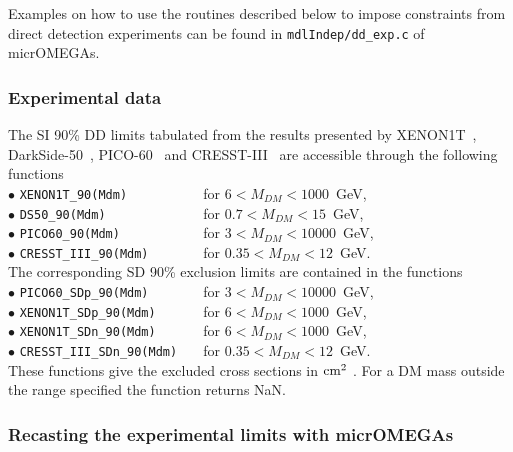 \documentclass[12pt,a4paper]{article}
\begin{document}
Examples on how to use the routines described below to impose constraints from direct detection experiments  can be found  in \verb|mdlIndep/dd_exp.c| of micrOMEGAs. 
\subsubsection{Experimental data}

The SI 90\%  DD  limits  tabulated from the results presented by  XENON1T~\cite{Aprile:2018dbl}, DarkSide-50~\cite{Agnes:2018ves}, PICO-60~\cite{Amole:2019fdf}  and CRESST-III~\cite{Abdelhameed:2019hmk}  are accessible through  the following functions \\

\noindent
$\bullet$ \verb|XENON1T_90(Mdm)          | for  $ 6 <  M_{DM} < 1000$~GeV, \cite{Aprile:2018dbl}  \\
\noindent
$\bullet$ \verb|DS50_90(Mdm)             | for  $ 0.7 < M_{DM} < 15$~GeV, \cite{Agnes:2018ves}   \\
\noindent
$\bullet$ \verb|PICO60_90(Mdm)           | for  $ 3 < M_{DM} < 10000$~GeV, \cite{Amole:2019fdf}   \\
\noindent
$\bullet$ \verb|CRESST_III_90(Mdm)       |  for $ 0.35 < M_{DM} < 12$~GeV. \cite{Abdelhameed:2019hmk} \\



\noindent
The corresponding SD 90\% exclusion limits are contained in the functions\\

\noindent 
$\bullet$ \verb|PICO60_SDp_90(Mdm)       | for  $ 3 < M_{DM} < 10000$~GeV,  \cite{Amole:2019fdf} \\
\noindent
$\bullet$ \verb|XENON1T_SDp_90(Mdm)      | for  $ 6 <  M_{DM} < 1000$~GeV, \cite{Aprile:2019dbj} \\
\noindent
$\bullet$ \verb|XENON1T_SDn_90(Mdm)      | for  $ 6 <  M_{DM} < 1000$~GeV, \cite{Aprile:2019dbj} \\
\noindent
$\bullet$ \verb|CRESST_III_SDn_90(Mdm)   |  for $ 0.35 < M_{DM} < 12$~GeV. ~\cite{Abdelhameed:2019hmk}\\


These functions give the  excluded cross sections in ${\rm cm}^2$ . For a DM mass outside the range specified the function returns NaN.

\subsubsection{Recasting the experimental limits with  micrOMEGAs}  
\label{Recasting}
\end{document}
